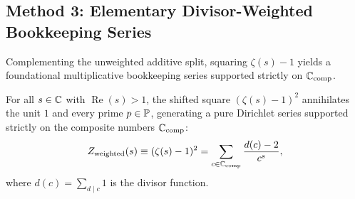 \subsection{Method 3: Elementary Divisor-Weighted Bookkeeping Series}

Complementing the unweighted additive split, squaring $\zeta(s) - 1$ yields a foundational multiplicative bookkeeping series supported strictly on $\mathbb{C}_{\mathrm{comp}}$.

\begin{proposition}
\label{thm:divisor_weighted}
\leanok
For all $s \in \mathbb{C}$ with $\operatorname{Re}(s) > 1$, the shifted square $(\zeta(s) - 1)^2$ annihilates the unit $1$ and every prime $p \in \mathbb{P}$, generating a pure Dirichlet series supported strictly on the composite numbers $\mathbb{C}_{\mathrm{comp}}$:
\begin{equation}
\label{eq:weighted_composite_series}
Z_{\mathrm{weighted}}(s) \equiv (\zeta(s) - 1)^2 = \sum_{c \in \mathbb{C}_{\mathrm{comp}}} \frac{d(c) - 2}{c^s},
\end{equation}
where $d(c) = \sum_{d \mid c} 1$ is the divisor function.
\end{proposition}

